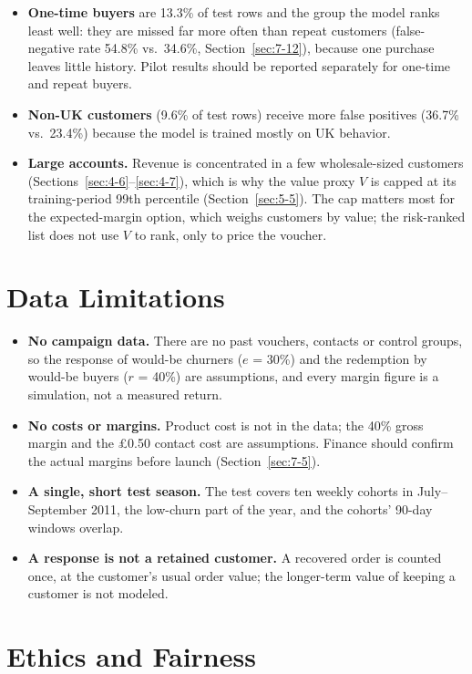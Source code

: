 \begin{itemize}
    \item \textbf{One-time buyers} are 13.3\% of test rows and the group the model ranks least well: they are missed far more often than repeat customers (false-negative rate 54.8\% vs.\ 34.6\%, Section~\ref{sec:7-12}), because one purchase leaves little history. Pilot results should be reported separately for one-time and repeat buyers.
    \item \textbf{Non-UK customers} (9.6\% of test rows) receive more false positives (36.7\% vs.\ 23.4\%) because the model is trained mostly on UK behavior.
    \item \textbf{Large accounts.} Revenue is concentrated in a few wholesale-sized customers (Sections~\ref{sec:4-6}--\ref{sec:4-7}), which is why the value proxy $V$ is capped at its training-period 99th percentile (Section~\ref{sec:5-5}). The cap matters most for the expected-margin option, which weighs customers by value; the risk-ranked list does not use $V$ to rank, only to price the voucher.
\end{itemize}

\section{Data Limitations}
\label{sec:9-4}

\begin{itemize}
    \item \textbf{No campaign data.} There are no past vouchers, contacts or control groups, so the response of would-be churners ($e$ = 30\%) and the redemption by would-be buyers ($r$ = 40\%) are assumptions, and every margin figure is a simulation, not a measured return.
    \item \textbf{No costs or margins.} Product cost is not in the data; the 40\% gross margin and the \pounds0.50 contact cost are assumptions. Finance should confirm the actual margins before launch (Section~\ref{sec:7-5}).
    \item \textbf{A single, short test season.} The test covers ten weekly cohorts in July--September 2011, the low-churn part of the year, and the cohorts' 90-day windows overlap.
    \item \textbf{A response is not a retained customer.} A recovered order is counted once, at the customer's usual order value; the longer-term value of keeping a customer is not modeled.
\end{itemize}

\section{Ethics and Fairness}
\label{sec:9-5}

